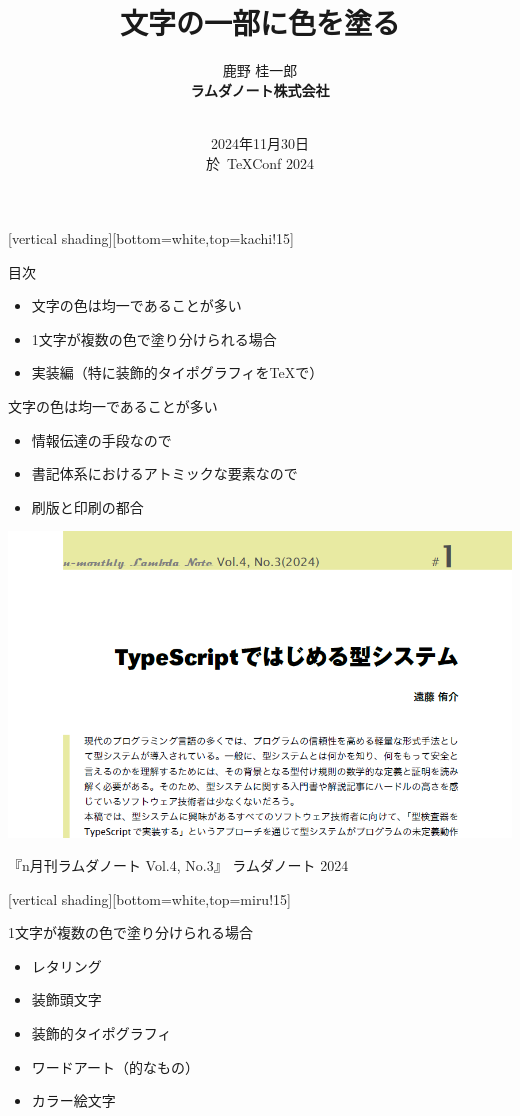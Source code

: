 \documentclass[unicode,14pt]{beamer}
\title{文字の一部に色を塗る}
\author{\sffamily 鹿野 桂一郎\\
\bfseries ラムダノート株式会社\\
\small\bfseries \email{k16.shikano@lambdanote.com} \\ 
\twitter{golden\_lucky} 
}
\date{\sffamily\footnotesize 2024年11月30日\\ 於\, TeXConf 2024}
\begin{document}
\frame{\titlepage}

[vertical shading][bottom=white,top=kachi!15]

\begin{frame}[t]{\inhibitglue 目次}
  \sffamily
  \begin{itemize}
    \item 文字の色は均一であることが多い
    \item 1文字が複数の色で塗り分けられる場合
    \item 実装編（特に装飾的タイポグラフィを\TeX{}で）
  \end{itemize}
\end{frame}

\begin{frame}[t]{文字の色は均一であることが多い}
  \sffamily
  \begin{itemize}
    \item 情報伝達の手段なので
    \item 書記体系におけるアトミックな要素なので
    \item 刷版と印刷の都合
  \end{itemize}
  \begin{center}
    \includegraphics[width=.50\textwidth]{figures/nlambda.png}
  \end{center}
\raggedleft\tiny\color{50gray} 『n月刊ラムダノート Vol.4, No.3』 ラムダノート 2024
\end{frame}

[vertical shading][bottom=white,top=miru!15]

\begin{frame}[t]{1文字が複数の色で塗り分けられる場合}
  \sffamily
  \begin{itemize}
\item レタリング
\item 装飾頭文字
\item 装飾的タイポグラフィ
\item ワードアート（的なもの）
\item カラー絵文字
  \end{itemize}
\end{frame}
\end{document}

